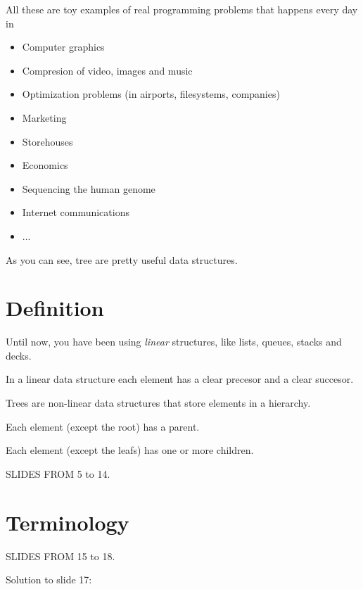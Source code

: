 \documentclass[a4paper, 9pt]{extarticle}
\newcommand{\separator}{\begin{center}%
\noindent\makebox[\linewidth]{\rule{0.75\paperwidth}{0.4pt}}%
\end{center}}
\begin{document}
\separator

All these are toy examples of real programming problems that happens every day in

\begin{itemize}
  \item Computer graphics
  \item Compresion of video, images and music
  \item Optimization problems (in airports, filesystems, companies)
  \item Marketing
  \item Storehouses
  \item Economics
  \item Sequencing the human genome
  \item Internet communications
  \item ...
\end{itemize}

As you can see, tree are pretty useful data structures.


\section{Definition}

Until now, you have been using \emph{linear} structures, like lists, queues, stacks and decks.

In a linear data structure each element has a clear precesor and a clear succesor.

Trees are non-linear data structures that store elements in a hierarchy.

Each element (except the root) has a parent.

Each element (except the leafs) has one or more children.

SLIDES FROM 5 to 14.



\section{Terminology}

SLIDES FROM 15 to 18.

Solution to slide 17:
\end{document}
